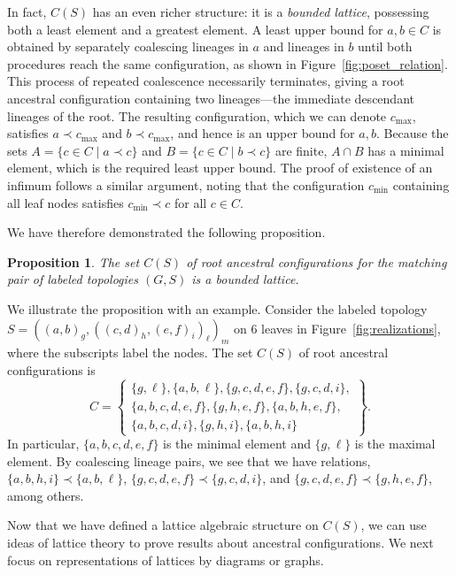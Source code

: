 \documentclass[10pt]{article}
\newtheorem{proposition}[theorem]{Proposition}
\begin{document}
In fact, $C(S)$ has an even richer structure: it is a \emph{bounded lattice}, possessing both a least element and a greatest element. A least upper bound for $a,b \in C$ is obtained by separately coalescing lineages in $a$ and lineages in $b$ until both procedures reach the same configuration, as shown in Figure~\ref{fig:poset_relation}. This process of repeated coalescence necessarily terminates, giving a root ancestral configuration containing two lineages---the immediate descendant lineages of the root. The resulting configuration, which we can denote $c_{\max}$, satisfies $a \prec c_{\max}$ and $b \prec c_{\max}$, and hence is an upper bound for $a,b$. Because the sets $A = \{c \in C\mid a \prec c\}$ and $B = \{c \in C\mid b \prec c\}$ are finite, $A \cap B$ has a minimal element, which is the required least upper bound. The proof of existence of an infimum follows a similar argument, noting that the configuration $c_{\min}$ containing all leaf nodes satisfies $c_{\min} \prec c$ for all $c \in C$.

We have therefore demonstrated the following proposition.

\begin{proposition}\label{prop:acs_are_lattices}
	The set $C(S)$ of root ancestral configurations for the matching pair of labeled topologies $(G,S)$ is a bounded lattice.
\end{proposition}

We illustrate the proposition with an example. Consider the labeled topology $S = ((a,b)_g,((c,d)_h,(e,f)_i)_\ell)_m$ on $6$ leaves in Figure~\ref{fig:realizations}, where the subscripts label the nodes. The set $C(S)$ of root ancestral configurations is
\[
	C = \left\{\begin{array}{c}
		\{g,\ell\}, \{a,b,\ell\}, \{g,c,d,e,f\}, \{g,c,d,i\}, \\
		\{a,b,c,d,e,f\}, \{g,h,e,f\}, \{a,b,h,e,f\}, \\
		\{a,b,c,d,i\}, \{g,h,i\}, \{a,b,h,i\}
	\end{array}\right\}.
\]
In particular, $\{a,b,c,d,e,f\}$ is the minimal element and $\{g,\ell\}$ is the maximal element. By coalescing lineage pairs, we see that we have relations, $\{a,b,h,i\}\prec\{a,b,\ell\}$, $\{g,c,d,e,f\}\prec\{g,c,d,i\}$, and $\{g,c,d,e,f\}\prec\{g,h,e,f\}$, among others.

Now that we have defined a lattice algebraic structure on $C(S)$, we can use ideas of lattice theory to prove results about ancestral configurations. We next focus on representations of lattices by diagrams or graphs.
\end{document}
